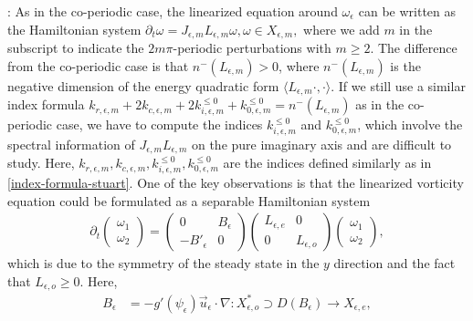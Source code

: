 \documentclass[1 [leqno, 11pt]{amsart}
\numberwithin{equation}{section}
\let\ep=\epsilon
\begin{document}
\begin{CJK*}{GBK}{song}
 \medskip

:
As in the co-periodic case, the linearized equation around  $\omega_\ep$ can be written as
the  Hamiltonian system
$
 \partial_t \omega = J_{\epsilon,m} L_{\epsilon,m}\omega,  \omega \in X_{\ep,m},
 $
where we add $m$ in the subscript to indicate the $2m\pi$-periodic perturbations with $m\geq2$.
The difference from the co-periodic case is that $n^-(L_{\epsilon,m})>0$, where $n^-(L_{\epsilon,m})$ is the negative dimension   of the energy quadratic form $\langle L_{\epsilon,m}\cdot,\cdot\rangle$. If we still use a similar index formula
 $
k_{r,\ep,m} + 2k_{c,\ep,m}+2k_{i,\ep,m}^{\leq0}+k_{0,\ep,m}^{\leq0} = n^-(L_{\ep,m})
$
  as  in the co-periodic case, we have to compute
the indices $k_{i,\ep,m}^{\leq0}$ and  $k_{0,\ep,m}^{\leq0}$, which involve the spectral information of $J_{\epsilon,m} L_{\epsilon,m}$ on the pure imaginary axis and are difficult to study.
Here, $k_{r,\ep,m}, k_{c,\ep,m}, k_{i,\ep,m}^{\leq0}, k_{0,\ep,m}^{\leq0}$ are the indices defined similarly as in \eqref{index-formula-stuart}.
One of the key observations is that  the linearized vorticity equation could be formulated as a
separable Hamiltonian system
\begin{align}\label{s Hamiltonian system-introduction}
\partial_t \left( \begin{array}{c} \omega_1 \\ \omega_2 \end{array} \right) = \left( \begin{array}{cc} 0 & B_\ep \\ -B'_\ep & 0 \end{array} \right)\left( \begin{array}{cc} L_{\ep,e} & 0 \\ 0 & L_{\ep,o} \end{array} \right) \left( \begin{array}{c} \omega_1 \\ \omega_2 \end{array} \right),
\end{align}
 which is
due to the symmetry of the steady state   in the $y$ direction and the fact that $L_{\ep,o}\geq0$. Here,
\begin{align*}B_\ep &= -g'(\psi_\ep) \vec{u}_\ep \cdot \nabla : X_{\ep, o}^* \supset D(B_\ep) \rightarrow X_{\ep, e}, \\

\end{align*}
\end{CJK*}
\end{document}
